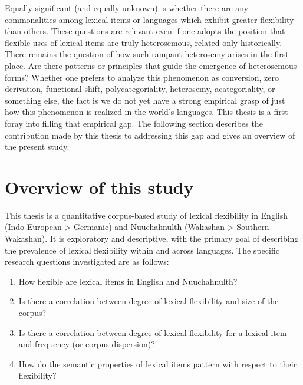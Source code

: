 \noindent Equally significant (and equally unknown) is whether there are any commonalities among lexical items or languages which exhibit greater flexibility than others. These questions are relevant even if one adopts the position that flexible uses of lexical items are truly heterosemous, related only historically. There remains the question of how such rampant heterosemy arises in the first place. Are there patterns or principles that guide the emergence of heterosemous forms? Whether one prefers to analyze this phenomenon as conversion, zero derivation, functional shift, polycategoriality, heterosemy, acategoriality, or something else, the fact is we do not yet have a strong empirical grasp of just how this phenomenon is realized in the world's languages. This thesis is a first foray into filling that empirical gap. The following section describes the contribution made by this thesis to addressing this gap and gives an overview of the present study.

\section{Overview of this study}
\label{sec:1.3}

This thesis is a quantitative corpus-based study of lexical flexibility in English (Indo-European > Germanic) and Nuuchahnulth (Wakashan > Southern Wakashan). It is exploratory and descriptive, with the primary goal of describing the prevalence of lexical flexibility within and across languages. The specific research questions investigated are as follows:

\begin{enumerate}[
  label      = {\textbf{R\arabic*:}},
  leftmargin = *,
  ref        = {R\arabic*}
]
  \item\label{R1} How flexible are lexical items in English and Nuuchahnulth?
  \item\label{R2} Is there a correlation between degree of lexical flexibility and size of the corpus?
  \item\label{R3} Is there a correlation between degree of lexical flexibility for a lexical item and frequency (or corpus dispersion)?
  \item\label{R4} How do the semantic properties of lexical items pattern with respect to their flexibility?
\end{enumerate}

